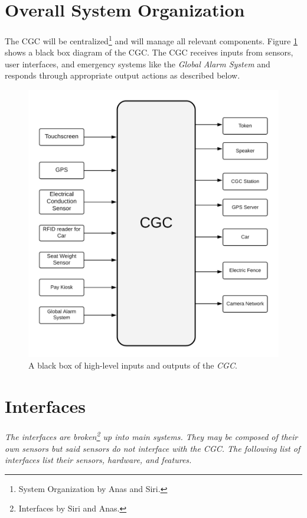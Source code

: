 \documentclass[12pt]{article}
\begin{document}
\section{Overall System Organization} 
\label{sys}
\paragraph{} The CGC will be centralized\footnote{System Organization 
by Anas and Siri.} and will manage all relevant components. Figure 
\ref{fig:blackbox} shows a black box diagram of the CGC. The CGC receives inputs 
from sensors, user interfaces, and emergency systems like the \textit{Global 
Alarm System} and responds through appropriate output actions as described 
below. 
\begin{figure}[H]
	\centerline{\includegraphics[scale=.20]{CGCBlackBox.png}}
	\caption{A black box of high-level inputs and outputs of the \textit{CGC}.}
	\label{fig:blackbox}
\end{figure}
\vfill
\pagebreak

\section{Interfaces}
\label{int}
\paragraph{} \textit{The interfaces are broken\footnote{Interfaces by Siri 
and Anas.} up into main systems. They may be composed of their own 
sensors but said sensors do not interface with the CGC. The following list of interfaces 
list their sensors, hardware, and features.}
\end{document}
